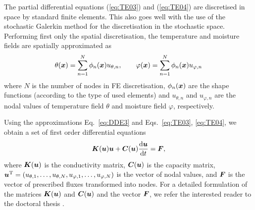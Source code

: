 \documentclass[preprint,12pt]{elsarticle}
\newcommand{\vek}[1]{\mathchoice{\displaystyle\boldsymbol#1}
{\textstyle\boldsymbol#1}{\scriptstyle\boldsymbol#1}
{\scriptscriptstyle\boldsymbol#1}}
\begin{document}
The partial differential equations
(\ref{eq:TE03}) and (\ref{eq:TE04}) are discretised in space by
standard finite elements.  This also goes well with the
use of the stochastic Galerkin method for the discretisation
in the stochastic space. Performing first only the spatial
discretisation, the
temperature and moisture fields are spatially approximated as
\begin{equation}
\theta(\vek{x})= \sum_{n=1}^N \phi_n(\vek{x})u_{\theta,n}, \qquad
\varphi(\vek{x})= \sum_{n=1}^N \phi_n(\vek{x})u_{\varphi,n}
\label{eq:DDE3}
\end{equation}
where $N$ is the number of nodes in FE discretisation,
$\phi_n(\vek{x})$ are the shape functions (according to the type of
used elements) and $u_{\theta,n}$ and $u_{\varphi,n}$ are the nodal
values of temperature field $\theta$ and moisture field $\varphi$,
respectively.

Using the approximations Eq.~\eqref{eq:DDE3} and Eqs.~\eqref{eq:TE03},
\eqref{eq:TE04}, we obtain a set of first order differential equations
\begin{equation}
  \vek{K}(\vek{u})\vek{u}+\vek{C}(\vek{u})\frac{\mathrm{d}\vek{u}}{\mathrm{d}t} =  \vek{F},\label{eq:MS1}
\end{equation}
where $\vek{K}(\vek{u})$ is the conductivity matrix,
$\vek{C}(\vek{u})$ is the capacity matrix,
$\vek{u}^\mathrm{T}=(u_{\theta,1}, \dots,
u_{\theta,N},u_{\varphi,1},\dots,u_{\varphi,N})$ is the vector of
nodal values, and $\vek{F}$ is the vector of prescribed fluxes
transformed into nodes. For a detailed formulation of the matrices
$\vek{K}(\vek{u})$ and $\vek{C}(\vek{u})$ and the vector
$\vek{F}$, we refer the interested reader to the doctoral thesis
\cite[Chapter 3.1]{Sykora:2010:phd}.
\end{document}
